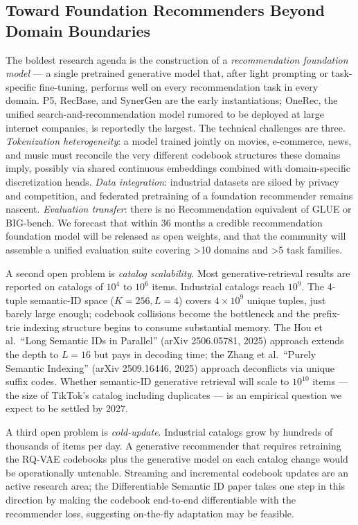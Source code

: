 \documentclass{article}
\begin{document}
\subsection{Toward Foundation Recommenders Beyond Domain Boundaries}\label{toward-foundation-recommenders-beyond-domain-boundaries}

The boldest research agenda is the construction of a \emph{recommendation foundation model} --- a single pretrained generative model that, after light prompting or task-specific fine-tuning, performs well on every recommendation task in every domain. P5, RecBase, and SynerGen are the early instantiations; OneRec, the unified search-and-recommendation model rumored to be deployed at large internet companies, is reportedly the largest. The technical challenges are three. \emph{Tokenization heterogeneity}: a model trained jointly on movies, e-commerce, news, and music must reconcile the very different codebook structures these domains imply, possibly via shared continuous embeddings combined with domain-specific discretization heads. \emph{Data integration}: industrial datasets are siloed by privacy and competition, and federated pretraining of a foundation recommender remains nascent. \emph{Evaluation transfer}: there is no Recommendation equivalent of GLUE or BIG-bench. We forecast that within 36 months a credible recommendation foundation model will be released as open weights, and that the community will assemble a unified evaluation suite covering \textgreater10 domains and \textgreater5 task families.

A second open problem is \emph{catalog scalability}. Most generative-retrieval results are reported on catalogs of \(10^4\) to \(10^6\) items. Industrial catalogs reach \(10^9\). The 4-tuple semantic-ID space (\(K=256, L=4\)) covers \(4 \times 10^9\) unique tuples, just barely large enough; codebook collisions become the bottleneck and the prefix-trie indexing structure begins to consume substantial memory. The Hou et al.~``Long Semantic IDs in Parallel'' (arXiv 2506.05781, 2025) approach extends the depth to \(L=16\) but pays in decoding time; the Zhang et al.~``Purely Semantic Indexing'' (arXiv 2509.16446, 2025) approach deconflicts via unique suffix codes. Whether semantic-ID generative retrieval will scale to \(10^{10}\) items --- the size of TikTok's catalog including duplicates --- is an empirical question we expect to be settled by 2027.

A third open problem is \emph{cold-update}. Industrial catalogs grow by hundreds of thousands of items per day. A generative recommender that requires retraining the RQ-VAE codebooks plus the generative model on each catalog change would be operationally untenable. Streaming and incremental codebook updates are an active research area; the Differentiable Semantic ID paper \citep{fu2026differentiablesema} takes one step in this direction by making the codebook end-to-end differentiable with the recommender loss, suggesting on-the-fly adaptation may be feasible.
\end{document}
